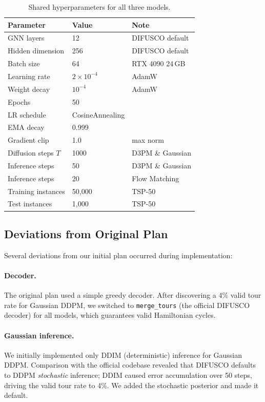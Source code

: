 \documentclass[11pt,a4paper]{article}
\begin{document}
\begin{table}[h]
\centering
\caption{Shared hyperparameters for all three models.}
\label{tab:hyperparams}
\begin{tabular}{lll}
\toprule
Parameter & Value & Note \\
\midrule
GNN layers & 12 & DIFUSCO default \\
Hidden dimension & 256 & DIFUSCO default \\
Batch size & 64 & RTX 4090 24\,GB \\
Learning rate & $2\times10^{-4}$ & AdamW \\
Weight decay & $10^{-4}$ & AdamW \\
Epochs & 50 & \\
LR schedule & CosineAnnealing & \\
EMA decay & 0.999 & \\
Gradient clip & 1.0 & max norm \\
Diffusion steps $T$ & 1000 & D3PM \& Gaussian \\
Inference steps & 50 & D3PM \& Gaussian \\
Inference steps & 20 & Flow Matching \\
Training instances & 50{,}000 & TSP-50 \\
Test instances & 1{,}000 & TSP-50 \\
\bottomrule
\end{tabular}
\end{table}

\subsection{Deviations from Original Plan}
\label{sec:deviations}

Several deviations from our initial plan occurred during implementation:

\paragraph{Decoder.}
The original plan used a simple greedy decoder. After discovering a 4\% valid tour rate
for Gaussian DDPM, we switched to \texttt{merge\_tours} (the official DIFUSCO decoder)
for all models, which guarantees valid Hamiltonian cycles.

\paragraph{Gaussian inference.}
We initially implemented only DDIM (deterministic) inference for Gaussian DDPM.
Comparison with the official codebase revealed that DIFUSCO defaults to DDPM
\emph{stochastic} inference; DDIM caused error accumulation over 50 steps,
driving the valid tour rate to 4\%. We added the stochastic posterior and made it default.
\end{document}
